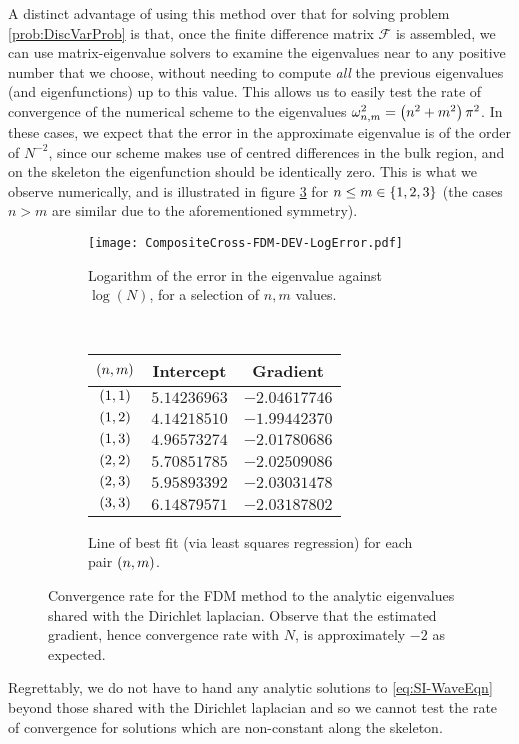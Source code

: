 A distinct advantage of using this method over that for solving problem \ref{prob:DiscVarProb} is that, once the finite difference matrix $\mathcal{F}$ is assembled, we can use matrix-eigenvalue solvers to examine the eigenvalues near to any positive number that we choose, without needing to compute \emph{all} the previous eigenvalues (and eigenfunctions) up to this value.
This allows us to easily test the rate of convergence of the numerical scheme to the eigenvalues $\omega_{n,m}^2 = \left( n^2+m^2 \right)\pi^2$.
In these cases, we expect that the error in the approximate eigenvalue is of the order of $N^{-2}$, since our scheme makes use of centred differences in the bulk region, and on the skeleton the eigenfunction should be identically zero.
This is what we observe numerically, and is illustrated in figure \ref{fig:CompositeCross-FDM-DEV} for $n\leq m\in\left\{ 1,2,3 \right\}$ (the cases $n>m$ are similar due to the aforementioned symmetry).
\begin{figure}[h]
	\centering
	\begin{subfigure}[t]{0.45\textwidth}
		\centering
		\texttt{[image: CompositeCross-FDM-DEV-LogError.pdf]}
		\caption{\label{fig:CompositeCross-FDM-DEV-LogError} Logarithm of the error in the eigenvalue against $\log(N)$, for a selection of $n,m$ values.}
	\end{subfigure}
	~
	\begin{subfigure}[t]{0.45\textwidth}
		\centering
		\begin{tabular}[b]{| c | c | c |}
			\hline
			$\left( n,m \right)$ & Intercept & Gradient \\
			\hline
			$\left( 1, 1 \right)$ & $5.14236963$ & $-2.04617746$ \\
			\hline
			$\left( 1, 2 \right)$ & $4.14218510$ & $-1.99442370$ \\
			\hline
			$\left( 1, 3 \right)$ & $4.96573274$ & $-2.01780686$ \\
			\hline
			$\left( 2, 2 \right)$ & $5.70851785$ & $-2.02509086$ \\
			\hline
			$\left( 2, 3 \right)$ & $5.95893392$ & $-2.03031478$ \\
			\hline
			$\left( 3, 3 \right)$ & $6.14879571$ & $-2.03187802$ \\
			\hline
		\end{tabular}
		\caption{\label{fig:CompositeCross-FDM-DEV-LoBF} Line of best fit (via least squares regression) for each pair $\left( n,m \right)$.}
	\end{subfigure}
	\caption{\label{fig:CompositeCross-FDM-DEV} Convergence rate for the FDM method to the analytic eigenvalues shared with the Dirichlet laplacian. Observe that the estimated gradient, hence convergence rate with $N$, is approximately $-2$ as expected.}
\end{figure}
Regrettably, we do not have to hand any analytic solutions to \eqref{eq:SI-WaveEqn} beyond those shared with the Dirichlet laplacian and so we cannot test the rate of convergence for solutions which are non-constant along the skeleton. 

